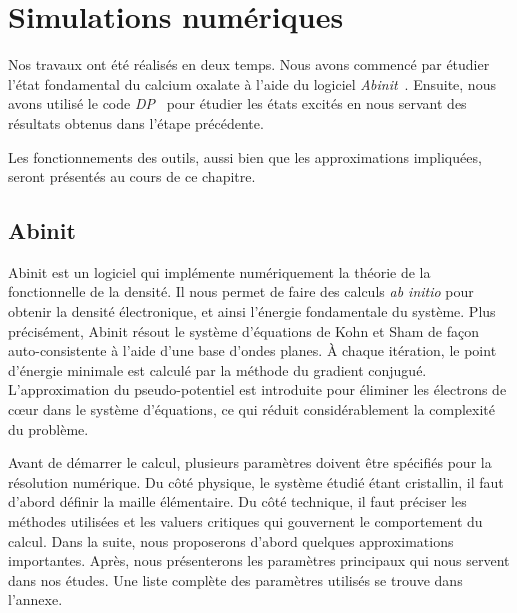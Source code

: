 \chapter{Simulations numériques}
\label{chap-simulation}
Nos travaux ont été réalisés en deux temps.
Nous avons commencé par étudier l'état fondamental du calcium oxalate à l'aide du logiciel \textit{Abinit}~\cite{Abinit}.
Ensuite, nous avons utilisé le code \textit{DP}~\cite{DP} pour étudier les états excités
en nous servant des résultats obtenus dans l'étape précédente.

Les fonctionnements des outils, aussi bien que les approximations impliquées,
seront présentés au cours de ce chapitre.

\section{Abinit}
\label{sec-abinit}
Abinit est un logiciel qui implémente numériquement la théorie de la fonctionnelle de la densité.
Il nous permet de faire des calculs \textit{ab initio} pour obtenir la densité électronique,
et ainsi l'énergie fondamentale du système.
Plus précisément, Abinit résout le système d'équations de Kohn et Sham de façon auto-consistente à l'aide d'une base d'ondes planes.
À chaque itération, le point d'énergie minimale est calculé par la méthode du gradient conjugué.
L'approximation du pseudo-potentiel est introduite pour éliminer les électrons de cœur dans le système d'équations,
ce qui réduit considérablement la complexité du problème.

Avant de démarrer le calcul,
plusieurs paramètres doivent être spécifiés pour la résolution numérique.
Du côté physique, le système étudié étant cristallin,
il faut d'abord définir la maille élémentaire.
Du côté technique, il faut préciser les méthodes utilisées et les valuers critiques qui gouvernent le comportement du calcul.
Dans la suite, nous proposerons d'abord quelques approximations importantes. Après,
nous présenterons les paramètres principaux qui nous servent dans nos études.
Une liste complète des paramètres utilisés se trouve dans l'annexe.


